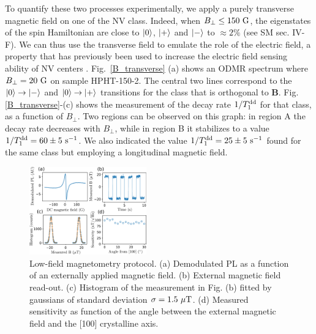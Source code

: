 \documentclass[preprintnumbers,amsmath,amssymb,superscriptaddress,twocolumn,showpacs]{revtex4-2}
\begin{document}
To quantify these two processes experimentally, we apply a purely transverse magnetic field on one of the NV class. Indeed, when $B_{\perp} \leq 150\ \rm G$, the eigenstates of the spin Hamiltonian are close to $\ket{0}$, $\ket{+}$ and $\ket{-}$ to $\approx 2\%$ (see SM sec. IV-F). We can thus use the transverse field to emulate the role of the electric field, a property that has previously been used to increase the electric field sensing ability of NV centers \cite{dolde2011electric,qiu2022nanoscale}.
Fig.~\ref{B_transverse} (a) shows an ODMR spectrum where $B_{\perp}=20\ \rm G$ on sample HPHT-150-2. The central two lines correspond to the $\ket{0}\to \ket{-}$ and $\ket{0}\to \ket{+}$ transitions for the class that is orthogonal to $\bm B$.
Fig. \ref{B_transverse}-(c) shows the measurement of the decay rate $1/T_1^{\rm dd}$ for that class, as a function of $B_{\perp}$. Two regions can be observed on this graph: in region A the decay rate decreases with $B_{\perp}$, while in region B it stabilizes to a value $1/T_1^{\rm dd}=60\pm 5\ \rm{s}^{-1}$. We also indicated the value $1/T_1^{\rm dd}=25\pm 5\ \rm{s}^{-1}$ found for the same class but employing a longitudinal magnetic field. %


\begin{figure}[ht]
\includegraphics[width=0.45\textwidth]{fig_magneto}
\caption{Low-field magnetometry protocol. (a) Demodulated PL as a function of an externally applied magnetic field. (b) External magnetic field read-out. (c) Histogram of the measurement in Fig. (b) fitted by gaussians of standard deviation $\sigma=1.5\ \mu \rm T$. (d) Measured sensitivity as function of the angle between the external magnetic field and the [100] crystalline axis.}
\label{magneto}
\end{figure}
\end{document}
